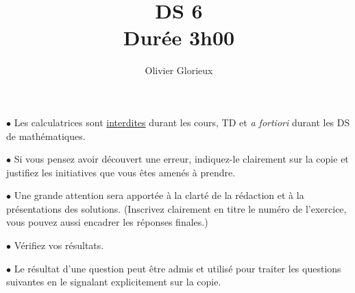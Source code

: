 \documentclass[a4paper, 11pt,reqno]{article}
\author{Olivier Glorieux}
\begin{document}
\title{DS 6\\
\Large{Durée 3h00}
}




\vspace{1cm}
\begin{center}

\begin{description}
\item$\bullet$ Les calculatrices sont \underline{interdites} durant les cours, TD et \emph{a fortiori} durant les DS de mathématiques. \\

\item $\bullet $ Si vous pensez avoir découvert une erreur, indiquez-le clairement sur la copie et justifiez les initiatives que vous êtes amenés à prendre. \\

\item $\bullet$ Une grande attention sera apportée à la clarté de la rédaction et à la présentations des solutions. (Inscrivez clairement en titre le numéro de l'exercice, vous pouvez aussi encadrer les réponses finales.)  \\

\item $\bullet$ Vérifiez vos résultats. \\

\item $\bullet$ Le résultat d'une question peut être admis et utilisé pour traiter les questions suivantes en le signalant explicitement sur la copie. 
\end{description}

\end{center} 
\end{document}
